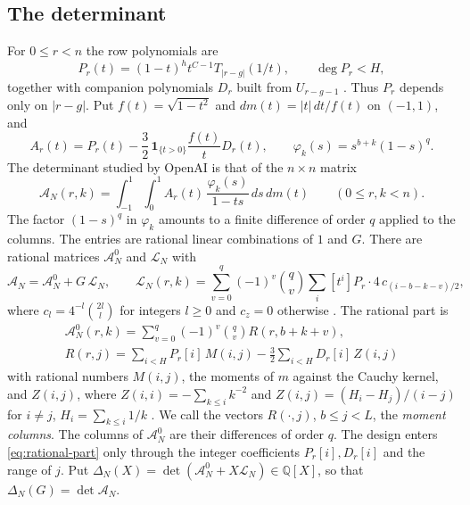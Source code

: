 \documentclass[11pt]{amsart}
\theoremstyle{definition}
\theoremstyle{remark}
\numberwithin{equation}{section}
\newcommand{\Q}{\mathbb Q}
\newcommand{\cA}{\mathcal A}
\newcommand{\cL}{\mathcal L}
\begin{document}
\subsection{The determinant}
For $0\le r<n$ the row polynomials are
\begin{equation}\label{eq:rows}
 P_r(t)=(1-t)^ht^{C-1}T_{|r-g|}(1/t),\qquad \deg P_r<H,
\end{equation}
together with companion polynomials $D_r$ built from $U_{r-g-1}$ \cite[(3)]{OpenAI2026}. Thus $P_r$
depends only on $|r-g|$. Put $f(t)=\sqrt{1-t^2}$ and $dm(t)=|t|\,dt/f(t)$ on $(-1,1)$, and
\[
 A_r(t)=P_r(t)-\frac32\,\mathbf 1_{\{t>0\}}\frac{f(t)}{t}D_r(t),\qquad
 \varphi_k(s)=s^{b+k}(1-s)^q .
\]
The determinant studied by OpenAI is that of the $n\times n$ matrix
\begin{equation}\label{eq:matrix}
 \cA_N(r,k)=\int_{-1}^1\int_0^1 A_r(t)\,\frac{\varphi_k(s)}{1-ts}\,ds\,dm(t)
 \qquad(0\le r,k<n).
\end{equation}
The factor $(1-s)^q$ in $\varphi_k$ amounts to a finite difference of order $q$ applied to the columns. The
entries are rational linear combinations of $1$ and $G$. There are rational matrices $\cA^0_N$ and $\cL_N$
with
\begin{equation}\label{eq:L}
 \cA_N=\cA^0_N+G\,\cL_N,\qquad
 \cL_N(r,k)=\sum_{v=0}^{q}(-1)^v\binom qv\sum_{i}[t^i]P_r\cdot4\,c_{(i-b-k-v)/2},
\end{equation}
where $c_l=4^{-l}\binom{2l}{l}$ for integers $l\ge0$ and $c_z=0$ otherwise
\cite[Prop.~2.1 and (20)]{OpenAI2026}. The rational part is
\begin{equation}\label{eq:rational-part}
 \begin{gathered}
 \cA^0_N(r,k)=\sum_{v=0}^q(-1)^v\binom qv R(r,b+k+v),\\
 R(r,j)=\sum_{i<H}P_r[i]\,M(i,j)-\frac32\sum_{i<H}D_r[i]\,Z(i,j)
 \end{gathered}
\end{equation}
with rational numbers $M(i,j)$, the moments of $m$ against the Cauchy kernel, and $Z(i,j)$, where
$Z(i,i)=-\sum_{k\le i}k^{-2}$ and $Z(i,j)=(H_i-H_j)/(i-j)$ for $i\ne j$, $H_i=\sum_{k\le i}1/k$
\cite[Prop.~2.1]{OpenAI2026}. We call the vectors $R(\cdot,j)$, $b\le j<L$, the \emph{moment columns}. The
columns of $\cA^0_N$ are their differences of order $q$. The design enters \eqref{eq:rational-part} only
through the integer coefficients $P_r[i],D_r[i]$ and the range of $j$. Put
$\Delta_N(X)=\det(\cA^0_N+X\cL_N)\in\Q[X]$, so that $\Delta_N(G)=\det\cA_N$.
\end{document}
